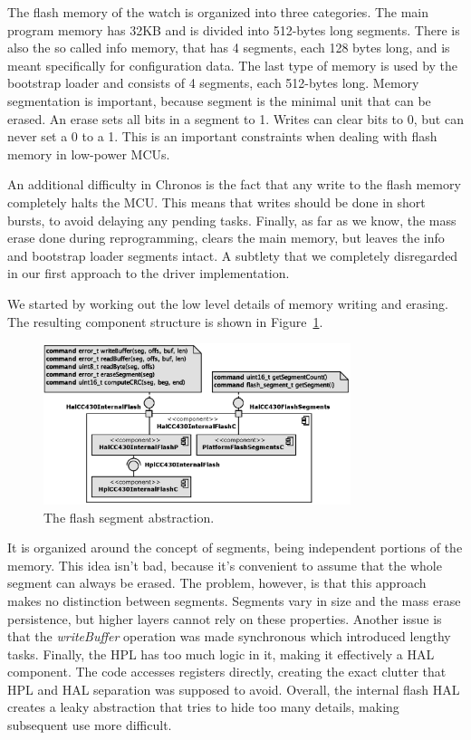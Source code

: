 The flash memory of the watch is organized into three categories. The main program memory has 32KB and is divided into 512-bytes long segments. There is also the so called info memory, that has 4 segments, each 128 bytes long, and is meant specifically for configuration data. The last type of memory is used by the bootstrap loader and consists of 4 segments, each 512-bytes long. Memory segmentation is important, because segment is the minimal unit that can be erased. An erase sets all bits in a segment to 1. Writes can clear bits to 0, but can never set a 0 to a 1. This is an important constraints when dealing with flash memory in low-power MCUs.

An additional difficulty in Chronos is the fact that any write to the flash memory completely halts the MCU. This means that writes should be done in short bursts, to avoid delaying any pending tasks. Finally, as far as we know, the mass erase done during reprogramming, clears the main memory, but leaves the info and bootstrap loader segments intact. A subtlety that we completely disregarded in our first approach to the driver implementation.

We started by working out the low level details of memory writing and erasing. The resulting component structure is shown in Figure~\ref{fig:hal_cc430_internal_flash_c}.
\begin{figure}[h]
  \centering
  \includegraphics[width=0.8\textwidth]{diagrams/hal_cc430_internal_flash_c.eps}
  \caption{The flash segment abstraction.}
  \label{fig:hal_cc430_internal_flash_c}
\end{figure}
It is organized around the concept of segments, being independent portions of the memory. This idea isn't bad, because it's convenient to assume that the whole segment can always be erased. The problem, however, is that this approach makes no distinction between segments. Segments vary in size and the mass erase persistence, but higher layers cannot rely on these properties. Another issue is that the \emph{writeBuffer} operation was made synchronous which introduced lengthy tasks. Finally, the HPL has too much logic in it, making it effectively a HAL component. The code accesses registers directly, creating the exact clutter that HPL and HAL separation was supposed to avoid. Overall, the internal flash HAL creates a leaky abstraction that tries to hide too many details, making subsequent use more difficult.

